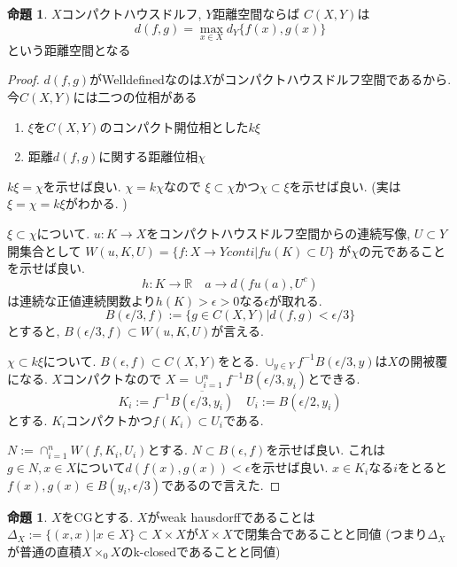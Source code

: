 \documentclass[dvipdfmx,a4paper,11pt]{article}
\newcommand{\R}{\mathbb{R}}
\theoremstyle{definition}
\newtheorem{prop}[thm]{命題}
\begin{document}
 \begin{tcolorbox}
 [colback = white, colframe = green!35!black, fonttitle = \bfseries,breakable = true]
\begin{prop}\cite[Prop2.１3]{Str}
$X$コンパクトハウスドルフ, $Y$距離空間ならば
$C(X,Y)$は
$$
d(f,g) = \max_{x \in X} d_Y\{f(x), g(x)\}
$$
という距離空間となる
\end{prop}
\end{tcolorbox}

\begin{proof}
$d(f,g) $がWelldefinedなのは$X$がコンパクトハウスドルフ空間であるから.
今$C(X,Y)$には二つの位相がある
\begin{enumerate}
\item $\xi$を$C(X,Y)$のコンパクト開位相とした$k \xi$
\item 距離$d(f,g)$に関する距離位相$\chi$
\end{enumerate}
$k \xi = \chi$を示せば良い.
$\chi = k \chi$なので
$\xi \subset \chi$かつ$\chi \subset \xi$を示せば良い.
(実は$\xi = \chi = k\xi$がわかる. )

$\xi \subset \chi$について.
$u : K \to X$をコンパクトハウスドルフ空間からの連続写像, $U \subset Y$開集合として
$W(u,K,U)=
\{f : X \to Y conti | fu(K) \subset U \}$
が$\chi$の元であることを示せば良い. 
$$
h : K \to \R \quad a \to d(fu(a), U^c)
$$
は連続な正値連続関数より$h(K) > \epsilon >0$なる$\epsilon$が取れる. 
$$
B(\epsilon/3 , f) := \{ g \in C(X,Y) | d(f,g) < \epsilon/3\}
$$
とすると, $B(\epsilon/3 , f) \subset W(u,K,U)$が言える. 

$ \chi \subset k \xi$について.
$B(\epsilon , f) \subset C(X,Y)$をとる. 
$\cup_{y \in Y}f^{-1}B(\epsilon/3 , y)$は$X$の開被覆になる.
$X$コンパクトなので
$X = \cup_{i=1}^{n}f^{-1}B(\epsilon/3 , y_i)$とできる. 
$$
K_i := f^{-1}\overline{B(\epsilon/3 , y_i)}
\quad
U_i := B(\epsilon/2 , y_i)
$$
とする. 
$K_i$コンパクトかつ$f(K_i) \subset U_i$である.

$N:= \cap_{i=1}^{n}W(f, K_i, U_i)$とする. 
$N \subset B(\epsilon , f) $を示せば良い.
これは$g \in N, x \in X$について$d(f(x),g(x))<\epsilon$を示せば良い.
$x \in K_i$なる$i$をとると$f(x), g(x) \in B(y_i , \epsilon/3)$であるので言えた.

\end{proof}

 \begin{tcolorbox}
 [colback = white, colframe = green!35!black, fonttitle = \bfseries,breakable = true]
\begin{prop}\cite[Prop2.14]{Str}
\label{Str-prop2.14}
$X$をCGとする.
$X$がweak hausdorffであることは
$\Delta_X := \{ (x,x)| x \in X\}\subset X \times X$が$X \times X$で閉集合であることと同値
(つまり$\Delta_X$が普通の直積$X \times_0 X$のk-closedであることと同値)
\end{prop}
\end{tcolorbox}
\end{document}
